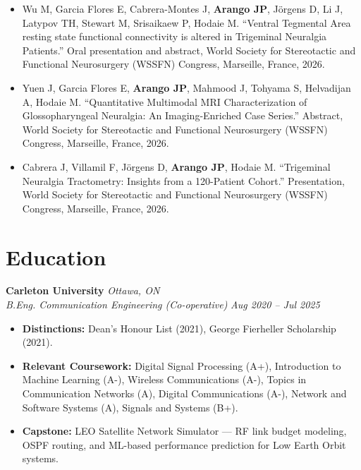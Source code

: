\documentclass[11pt, letterpaper]{article}
\newcommand{\cventry}[4]{
    \noindent\textbf{#1} \hfill \textit{#2} \\
    \textit{#3} \hfill \textit{\small #4} \\
    \vspace{-4pt}
}
\begin{document}
\begin{itemize}[leftmargin=1.5em, topsep=2pt, itemsep=4pt]
    \item Wu M, Garcia Flores E, Cabrera-Montes J, \textbf{Arango JP}, Jörgens D, Li J, Latypov TH, Stewart M, Srisaikaew P, Hodaie M. ``Ventral Tegmental Area resting state functional connectivity is altered in Trigeminal Neuralgia Patients.'' Oral presentation and abstract, World Society for Stereotactic and Functional Neurosurgery (WSSFN) Congress, Marseille, France, 2026.
    \item Yuen J, Garcia Flores E, \textbf{Arango JP}, Mahmood J, Tohyama S, Helvadijan A, Hodaie M. ``Quantitative Multimodal MRI Characterization of Glossopharyngeal Neuralgia: An Imaging-Enriched Case Series.'' Abstract, World Society for Stereotactic and Functional Neurosurgery (WSSFN) Congress, Marseille, France, 2026.
    \item Cabrera J, Villamil F, Jörgens D, \textbf{Arango JP}, Hodaie M. ``Trigeminal Neuralgia Tractometry: Insights from a 120-Patient Cohort.'' Presentation, World Society for Stereotactic and Functional Neurosurgery (WSSFN) Congress, Marseille, France, 2026.
\end{itemize}

\section{Education}

\cventry{Carleton University}{Ottawa, ON}{B.Eng. Communication Engineering (Co-operative)}{Aug 2020 -- Jul 2025}

\begin{itemize}[leftmargin=1.5em, topsep=2pt, itemsep=2pt]
    \item \textbf{Distinctions:} Dean's Honour List (2021), George Fierheller Scholarship (2021).

    \item \textbf{Relevant Coursework:} Digital Signal Processing (A+), Introduction to Machine Learning (A-), Wireless Communications (A-), Topics in Communication Networks (A), Digital Communications (A-), Network and Software Systems (A), Signals and Systems (B+).

    \item \textbf{Capstone:} LEO Satellite Network Simulator --- RF link budget modeling, OSPF routing, and ML-based performance prediction for Low Earth Orbit systems.
\end{itemize}
\end{document}
